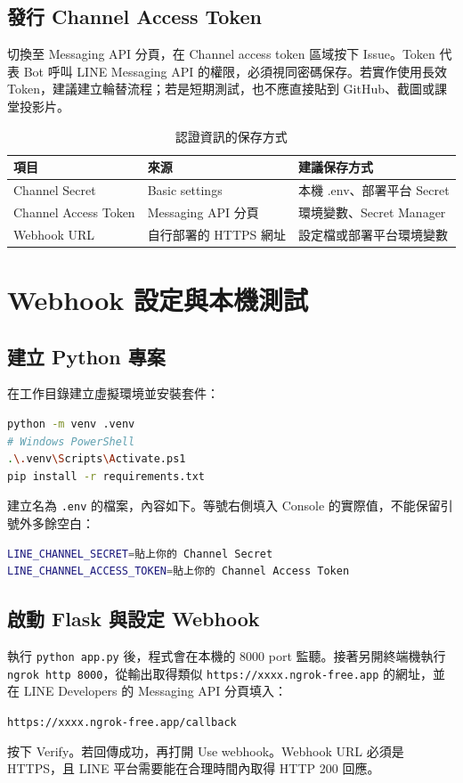 \documentclass[12pt,a4paper]{report}
\begin{document}
\section{發行 Channel Access Token}
切換至 Messaging API 分頁，在 Channel access token 區域按下 Issue。Token 代表 Bot 呼叫 LINE Messaging API 的權限，必須視同密碼保存。若實作使用長效 Token，建議建立輪替流程；若是短期測試，也不應直接貼到 GitHub、截圖或課堂投影片。

\begin{table}[htbp]
\centering
\caption{認證資訊的保存方式}
\label{tab:credentials}
\begin{tabular}{p{3.4cm}p{4cm}p{5cm}}
\toprule
項目 & 來源 & 建議保存方式 \\
\midrule
Channel Secret & Basic settings & 本機 .env、部署平台 Secret \\
Channel Access Token & Messaging API 分頁 & 環境變數、Secret Manager \\
Webhook URL & 自行部署的 HTTPS 網址 & 設定檔或部署平台環境變數 \\
\bottomrule
\end{tabular}
\end{table}

\chapter{Webhook 設定與本機測試}
\section{建立 Python 專案}
在工作目錄建立虛擬環境並安裝套件：
\begin{lstlisting}[language=bash,caption={建立虛擬環境與安裝依賴},label={lst:install}]
python -m venv .venv
# Windows PowerShell
.\.venv\Scripts\Activate.ps1
pip install -r requirements.txt
\end{lstlisting}

建立名為 \texttt{.env} 的檔案，內容如下。等號右側填入 Console 的實際值，不能保留引號外多餘空白：
\begin{lstlisting}[language=bash,caption={環境變數設定範例},label={lst:env}]
LINE_CHANNEL_SECRET=貼上你的 Channel Secret
LINE_CHANNEL_ACCESS_TOKEN=貼上你的 Channel Access Token
\end{lstlisting}

\section{啟動 Flask 與設定 Webhook}
執行 \texttt{python app.py} 後，程式會在本機的 8000 port 監聽。接著另開終端機執行 \texttt{ngrok http 8000}，從輸出取得類似 \texttt{https://xxxx.ngrok-free.app} 的網址，並在 LINE Developers 的 Messaging API 分頁填入：
\begin{center}
\texttt{https://xxxx.ngrok-free.app/callback}
\end{center}
按下 Verify。若回傳成功，再打開 Use webhook。Webhook URL 必須是 HTTPS，且 LINE 平台需要能在合理時間內取得 HTTP 200 回應。
\end{document}

